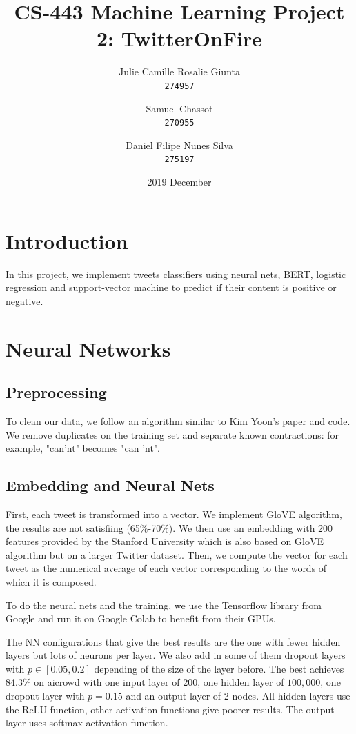 \documentclass[11pt, a4paper, twocolumn]{article}
\begin{document}
\date{2019 December}
\title{CS-443 Machine Learning Project 2: TwitterOnFire}
\author{
  Julie Camille Rosalie Giunta\\
  \texttt{274957}
  \and
  Samuel Chassot\\
  \texttt{270955}
  \and
  Daniel Filipe Nunes Silva\\
  \texttt{275197}
}

\maketitle
\clearpage

\section{Introduction}
In this project, we implement tweets classifiers using neural nets, BERT, logistic regression and support-vector machine to predict if their content is positive or negative.

\section{Neural Networks}

\subsection{Preprocessing}
To clean our data, we follow an algorithm similar to Kim Yoon's paper\cite{kimyoonpaper} and code\cite{kimyooncode}. We remove duplicates on the training set and separate known contractions: for example, "can'nt" becomes "can 'nt".

\subsection{Embedding and Neural Nets}
First, each tweet is transformed into a vector. We implement
GloVE algorithm, the results are not satisfiing (65\%-70\%). We then use an embedding with 200 features
provided by the Stanford University which is also based on GloVE algorithm but on a larger Twitter dataset\cite{glovepaper, gloveembedding}. 
Then, we compute the vector for each tweet as the numerical average of each vector corresponding to the 
words of which it is composed.

To do the neural nets and the training, we use the Tensorflow library from Google and run it on Google Colab to benefit from their GPUs.

The NN configurations that give the best results are the one with 
fewer hidden layers but lots of neurons per layer. We also add in some of them dropout layers with $p\in [0.05, 0.2]$ 
depending of the size of the layer before\cite{dropoutkeras}.
The best achieves 84.3\% on aicrowd with one input layer of $200$, one hidden layer of $100,000$, one dropout 
layer with $p=0.15$ and an output layer of 2 nodes. All hidden layers use the ReLU function, other activation functions give poorer results. The output layer uses softmax activation function.
\end{document}
